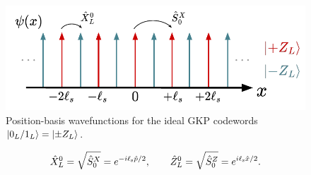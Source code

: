 \begin{figure}[t]
    \centering
    \includegraphics[width=0.85\linewidth]{Figures/2/GKP_Ideal_Wavefunctions.pdf}
    \caption{Position-basis wavefunctions for the ideal GKP codewords $\lvert0_L/1_L\rangle = \lvert\pm Z_L\rangle$.}
    \label{fig:2_GKP_Ideal_Wavefunctions}
\end{figure}
\begin{equation}
    \hat{X}_L^0 = \sqrt{\hat{S}_0^X} =  e^{-i\ell_{\rm s}\hat{p}/2} , \qquad \hat{Z}_L^0 = \sqrt{\hat{S}_0^Z} = e^{i\ell_{\rm s}\hat{x}/2}. 
\end{equation}

